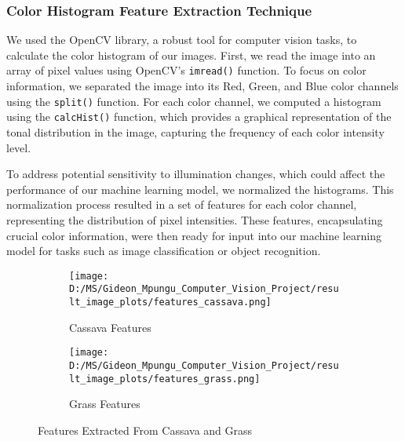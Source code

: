 \documentclass[10pt,twocolumn,letterpaper]{article}
\begin{document}
\subsubsection{Color Histogram Feature Extraction Technique}

We used the OpenCV library, a robust tool for computer vision tasks, to calculate the color histogram of our images. First, we read the image into an array of pixel values using OpenCV’s \texttt{imread()} function. To focus on color information, we separated the image into its Red, Green, and Blue color channels using the \texttt{split()} function. For each color channel, we computed a histogram using the \texttt{calcHist()} function, which provides a graphical representation of the tonal distribution in the image, capturing the frequency of each color intensity level.

To address potential sensitivity to illumination changes, which could affect the performance of our machine learning model, we normalized the histograms. This normalization process resulted in a set of features for each color channel, representing the distribution of pixel intensities. These features, encapsulating crucial color information, were then ready for input into our machine learning model for tasks such as image classification or object recognition.


\begin{figure*}[ht]
    \centering
    
    \begin{subfigure}{0.45\textwidth}
        \texttt{[image: D:/MS/Gideon\_Mpungu\_Computer\_Vision\_Project/result\_image\_plots/features\_cassava.png]}
        \caption{Cassava Features}
        \label{fig:cassava}
    \end{subfigure}
    \hfill
    \begin{subfigure}{0.45\textwidth}
        \texttt{[image: D:/MS/Gideon\_Mpungu\_Computer\_Vision\_Project/result\_image\_plots/features\_grass.png]}
        \caption{Grass Features}
        \label{fig:grass}
    \end{subfigure}
    
    \caption{Features Extracted From Cassava and Grass}
    \label{fig:features}
\end{figure*}
\end{document}
